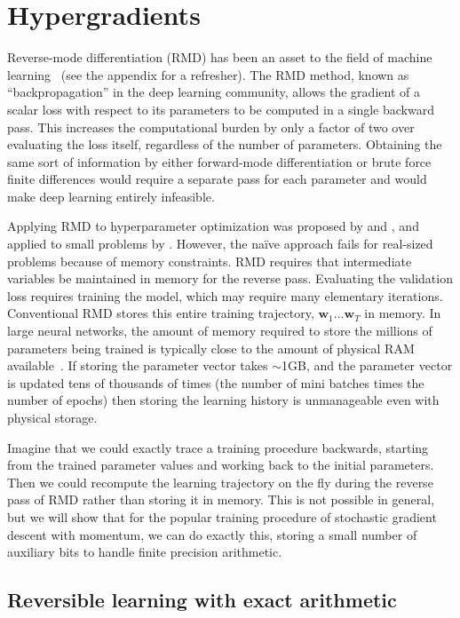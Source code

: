 \documentclass{article}
\newcommand{\vw}{\mathbf{w}}
\newcommand{\primal}{elementary}
\newcommand{\params}{\vw}
\begin{document}
\section{Hypergradients}
\label{sec:hypergradients}

Reverse-mode differentiation (RMD) has been an asset to the field of machine
learning~\citep{lecun1989backpropagation} (see the appendix for a refresher). The RMD method, known as
``backpropagation'' in the deep learning community, allows the gradient of a
scalar loss with respect to its parameters to be computed in a single backward
pass.
This increases the computational burden by only a factor of two over
evaluating the loss itself, regardless of the number of parameters.
Obtaining the same sort of information by either forward-mode
differentiation or brute force finite differences would require a separate pass
for each parameter and would make deep learning entirely infeasible.

Applying RMD to hyperparameter optimization was proposed by \citet{bengio2000gradient} and \citet{Autodiff14}, and applied to small problems by \citet{domke2012generic}.
However, the na\"ive approach fails for real-sized problems because
of memory constraints. RMD requires that intermediate variables be maintained
in memory for the reverse pass. Evaluating the validation loss
requires training the model, which may require many \primal{} iterations. Conventional
RMD stores this entire training trajectory, $\params_1
... \params_T$ in memory.  In large neural networks, the amount of
memory required to store the millions of parameters being trained is typically
close to the amount of physical RAM available~\cite{sequence2014}. If storing
the parameter vector takes $\sim$1GB, and the parameter vector is updated tens
of thousands of times (the number of mini batches times the number of
epochs) then storing the learning history is unmanageable even with
physical storage.

Imagine that we could exactly trace a training
procedure backwards, starting from the trained parameter values and working
back to the initial parameters. Then we could recompute the learning trajectory
on the fly during the reverse pass of RMD rather than storing it in memory. This is
not possible in general, but we will show that for the popular training
procedure of stochastic gradient descent with momentum, we can do
exactly this, storing a small number of auxiliary bits to handle
finite precision arithmetic.

\subsection{Reversible learning with exact arithmetic}
\label{sec:reversible learning}
\end{document}
